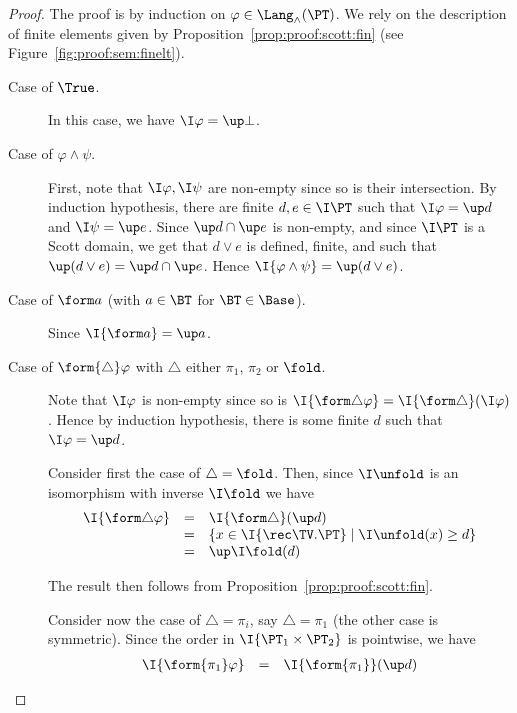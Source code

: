 \begin{proof}
The proof is by induction on $\varphi \in \Lang_\land(\PT)$.
We rely on the description of finite elements given
by Proposition~\ref{prop:proof:scott:fin}
(see Figure~\ref{fig:proof:sem:finelt}).
\begin{description}
\item[Case of $\True$.]
In this case, we have $\I\varphi = \up \bot$.

\item[Case of $\varphi \land \psi$.]
First, note that $\I\varphi, \I\psi$ are non-empty since so is their intersection.
By induction hypothesis, there are finite $d,e \in \I\PT$
such that $\I\varphi = \up d$ and $\I\psi = \up e$.
Since $\up d \cap \up e$ is non-empty, and since $\I\PT$ is a Scott domain,
we get that $d \vee e$ is defined, finite, and such that
$\up(d\vee e) = \up d \cap \up e$.
Hence $\I{\varphi \land \psi} = \up(d \vee e)$.

\item[Case of $\form a$ (with $a \in \BT$ for $\BT \in \Base$).]
Since $\I{\form a} = \up a$.

\item[Case of $\form{\triangle}\varphi$
with $\triangle$ either $\pi_1$, $\pi_2$ or $\fold$.]
Note that $\I\varphi$ is non-empty since so is
$\I{\form\triangle\varphi} = \I{\form\triangle}(\I\varphi)$.
Hence by induction hypothesis, there is some finite $d$
such that $\I\varphi = \up d$.

Consider first the case of $\triangle = \fold$.
Then, since $\I\unfold$ is an isomorphism with inverse $\I\fold$
we have
\[
\begin{array}{l l l}
  \I{\form\triangle\varphi}
& =
& \I{\form\triangle}(\up d)
\\

& =
& \left\{
  x \in \I{\rec\TV.\PT} \mid \I\unfold(x) \geq d
  \right\}
\\

& =
& \up \I\fold(d)
\end{array}
\]

\noindent
The result then follows from
Proposition~\ref{prop:proof:scott:fin}.

Consider now the case of $\triangle = \pi_i$,
say $\triangle = \pi_1$ (the other case is symmetric).
Since the order in $\I{\PT_1 \times \PT_2}$ is pointwise,
we have
\[
\begin{array}{l l l}
  \I{\form{\pi_1}\varphi}
& =
& \I{\form{\pi_1}}(\up d)


\end{array}\]
\end{description}
\end{proof}
